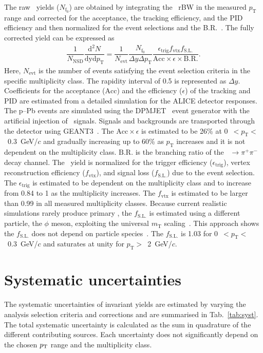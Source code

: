The raw \fzero~yields ($N_{\mathrm{f}_{0}}$) are obtained by integrating the \fzero~rBW in the measured $p_{\mathrm{T}}$ range and corrected for the acceptance, the tracking efficiency, and the PID efficiency and then normalized for the event selections and the B.R.~\cite{Stone:2013eaa}. The fully corrected yield can be expressed as
\begin{eqnarray}
\dfrac{1}{N_{\mathrm{NSD}}}\dfrac{\mathrm{d}^{2}N}{\mathrm{dyd}p_{\mathrm{T}}} = \dfrac{1}{N_{\mathrm{evt}}} \dfrac{ N_{\mathrm{f}_{0}} }{ \Delta y \Delta p_{\mathrm{T}} } \dfrac{  \epsilon_{\mathrm{trig}} f_{\mathrm{vtx}} f_{\mathrm{S.L.}} }{\mathrm{Acc} \times \epsilon \times \mathrm{B.R.} }.
\end{eqnarray}
Here, $N_{\mathrm{evt}}$ is the number of events satisfying the event selection criteria in the specific multiplicity class. The rapidity interval of 0.5 is represented as $\Delta y$. Coefficients for the acceptance ($\mathrm{Acc}$) and the efficiency ($\epsilon$) of the tracking and PID are estimated from a detailed simulation for the ALICE detector responses. The p--Pb events are simulated using the DPMJET~\cite{Fedynitch:2015kcn} event generator with the artificial injection of \fzero~signals. Signals and backgrounds are transported through the detector using GEANT3~\cite{Brun:1994aa}. The $\mathrm{Acc}\times\epsilon$ is estimated to be 26\% at 0~$<p_{\mathrm{T}}<$~0.3~GeV/$c$ and gradually increasing up to 60\% as $p_{\mathrm{T}}$ increases and it is not dependent on the multiplicity class. $\mathrm{B.R.}$ is the branching ratio of the \fzero~$\rightarrow \pi^{+}\pi^{-}$ decay channel. The \fzero~yield is normalized for the trigger efficiency ($\epsilon_{\mathrm{trig}}$), vertex reconstruction efficiency ($f_{\mathrm{vtx}}$), and signal loss ($f_{\mathrm{S.L.}}$) due to the event selection. The $\epsilon_{\mathrm{trig}}$ is estimated to be dependent on the multiplicity class and to increase from 0.84 to 1 as the multiplicity increases. The $f_{\mathrm{vtx}}$ is estimated to be larger than 0.99 in all measured multiplicity classes. Because current realistic simulations rarely produce primary \fzero, the $f_{\mathrm{S.L.}}$ is estimated using a different particle, the $\phi$ meson, exploiting the universal $m_{\mathrm{T}}$ scaling~\cite{Altenkamper:2017qot}. This approach shows the $f_{\mathrm{S.L.}}$ does not depend on particle species~\cite{ALICE:2019xyr}. The $f_{\mathrm{S.L.}}$ is 1.03 for 0~$<p_{\mathrm{T}}<$~0.3~GeV/$c$ and saturates at unity for $p_{\mathrm{T}}>$~2~GeV/$c$.

\section{Systematic uncertainties}
\label{sec:syst}
The systematic uncertainties of invariant yields are estimated by varying the analysis selection criteria and corrections and are summarised in Tab.~\ref{tab:syst}. The total systematic uncertainty is calculated as the sum in quadrature of the different contributing sources. Each uncertainty does not significantly depend on the chosen $p_{\rm{T}}$ range and the multiplicity class.

